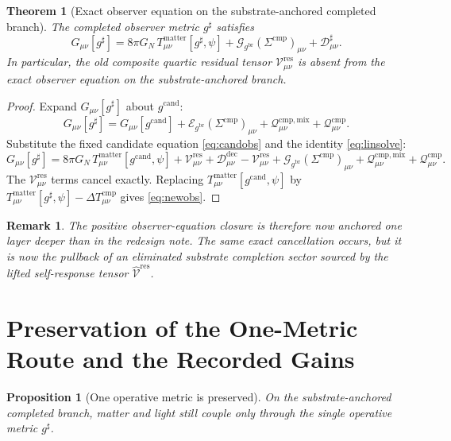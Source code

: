 \documentclass[11pt]{article}
\newcommand{\ObserverMetric}{g^{\mathrm{br}}}
\newcommand{\CandidateMetric}{g^{\mathrm{cand}}}
\newcommand{\CompletedMetric}{g^{\sharp}}
\newcommand{\CompShift}{\Sigma^{\mathrm{cmp}}}
\newcommand{\ResidualCore}{\mathcal V_{\mu\nu}^{\mathrm{res}}}
\newcommand{\ResidualDec}{\mathcal D_{\mu\nu}^{\mathrm{dec}}}
\newcommand{\ResidualLift}{\widehat{\mathcal V}^{\mathrm{res}}}
\newcommand{\GaugeBook}{\mathcal G_{\ObserverMetric}}
\newcommand{\EinLin}{\mathcal E_{\ObserverMetric}}
\newcommand{\CompMix}{\mathcal Q_{\mu\nu}^{\mathrm{cmp,mix}}}
\newcommand{\CompQuad}{\mathcal Q_{\mu\nu}^{\mathrm{cmp}}}
\newcommand{\CompDec}{\mathcal D_{\mu\nu}^{\sharp}}
\newcommand{\DeltaTComp}{\Delta T_{\mu\nu}^{\mathrm{cmp}}}
\newtheorem{proposition}{Proposition}
\newtheorem{remark}{Remark}
\newtheorem{theorem}{Theorem}
\begin{document}
\begin{theorem}[Exact observer equation on the substrate-anchored completed branch]
\label{thm:obs}
The completed observer metric \(\CompletedMetric\) satisfies
\begin{equation}
G_{\mu\nu}[\CompletedMetric]
=
8\pi G_N\,T_{\mu\nu}^{\mathrm{matter}}[\CompletedMetric,\psi]
+\GaugeBook(\CompShift)_{\mu\nu}
+\CompDec.
\label{eq:newobs}
\end{equation}
In particular, the old composite quartic residual tensor \(\ResidualCore\) is absent from the exact observer equation on the substrate-anchored branch.
\end{theorem}

\begin{proof}
Expand \(G_{\mu\nu}[\CompletedMetric]\) about \(\CandidateMetric\):
\begin{equation}
G_{\mu\nu}[\CompletedMetric]
=
G_{\mu\nu}[\CandidateMetric]
+\EinLin(\CompShift)_{\mu\nu}
+\CompMix+\CompQuad.
\label{eq:expand}
\end{equation}
Substitute the fixed candidate equation \eqref{eq:candobs} and the identity \eqref{eq:linsolve}:
\[
G_{\mu\nu}[\CompletedMetric]
=
8\pi G_N\,T_{\mu\nu}^{\mathrm{matter}}[\CandidateMetric,\psi]
+\ResidualCore+\ResidualDec
-\ResidualCore
+\GaugeBook(\CompShift)_{\mu\nu}
+\CompMix+\CompQuad.
\]
The \(\ResidualCore\) terms cancel exactly. Replacing \(T_{\mu\nu}^{\mathrm{matter}}[\CandidateMetric,\psi]\) by \(T_{\mu\nu}^{\mathrm{matter}}[\CompletedMetric,\psi]-\DeltaTComp\) gives \eqref{eq:newobs}.
\end{proof}

\begin{remark}
The positive observer-equation closure is therefore now anchored one layer deeper than in the redesign note. The same exact cancellation occurs, but it is now the pullback of an eliminated substrate completion sector sourced by the lifted self-response tensor \(\ResidualLift\).
\end{remark}

\section{Preservation of the One-Metric Route and the Recorded Gains}

\begin{proposition}[One operative metric is preserved]
\label{prop:onemetric}
On the substrate-anchored completed branch, matter and light still couple only through the single operative metric \(\CompletedMetric\).
\end{proposition}
\end{document}
